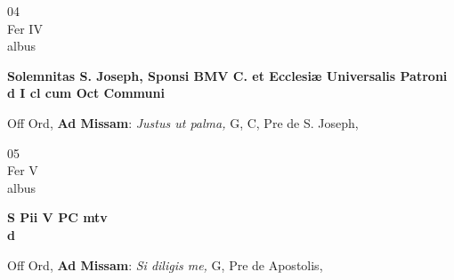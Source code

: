 \documentclass[10pt, openany]{book}
\begin{document}
        \begin{center}
            \begin{minipage}{3.5in}
                \vspace{2em}
                \begin{minipage}{0.5in}
                    {\Huge 04} \\
                    {\normalsize Fer IV} \\
                    {\normalsize albus}
                \end{minipage}
                \begin{minipage}{3.0in}
                    \textbf{ \large Solemnitas S. Joseph, Sponsi BMV C. et Ecclesiæ Universalis Patroni \\
                    \textnormal{\normalsize d I cl cum Oct Communi}} \\ 
                \end{minipage}
                \begin{justify}Off Ord, \textbf{Ad Missam}: \textit{Justus ut palma,} G, C, Pre de S. Joseph,  
                \end{justify}
            \end{minipage}
        \end{center}
    
        \begin{center}
            \begin{minipage}{3.5in}
                \vspace{2em}
                \begin{minipage}{0.5in}
                    {\Huge 05} \\
                    {\normalsize Fer V} \\
                    {\normalsize albus}
                \end{minipage}
                \begin{minipage}{3.0in}
                    \textbf{ \large S Pii V PC mtv \\
                    \textnormal{\normalsize d}} \\ 
                \end{minipage}
                \begin{justify}Off Ord, \textbf{Ad Missam}: \textit{Si diligis me,} G, Pre de Apostolis,  
                \end{justify}
            \end{minipage}
        \end{center}
    
\end{document}
